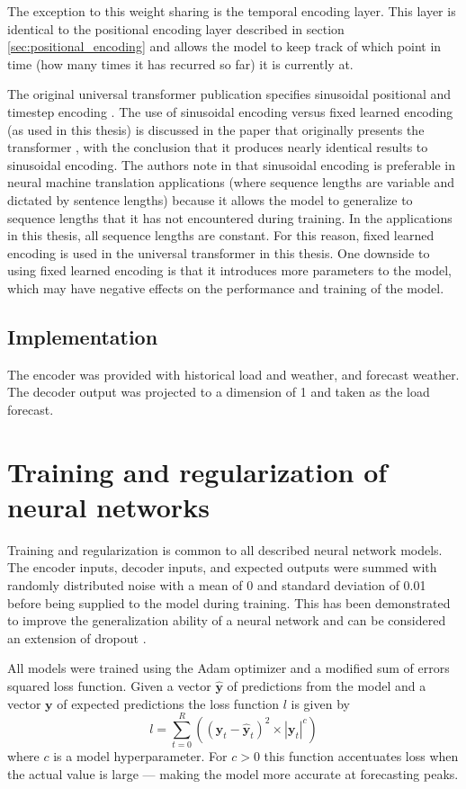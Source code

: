 The exception to this weight sharing is the temporal encoding layer.
This layer is identical to the positional encoding layer described in section \ref{sec:positional_encoding} and allows the model to keep track of which point in time (how many times it has recurred so far) it is currently at.

The original universal transformer publication specifies sinusoidal positional and timestep encoding \cite{Dehghani2018}.
The use of sinusoidal encoding versus fixed learned encoding (as used in this thesis) is discussed in the paper that originally presents the transformer \cite{Vaswani2017}, with the conclusion that it produces nearly identical results to sinusoidal encoding.
The authors note in \cite{Vaswani2017} that sinusoidal encoding is preferable in neural machine translation applications (where sequence lengths are variable and dictated by sentence lengths) because it allows the model to generalize to sequence lengths that it has not encountered during training.
In the applications in this thesis, all sequence lengths are constant.
For this reason, fixed learned encoding is used in the universal transformer in this thesis.
One downside to using fixed learned encoding is that it introduces more parameters to the model, which may have negative effects on the performance and training of the model.


\subsection{Implementation}
The encoder was provided with historical load and weather, and forecast weather.
The decoder output was projected to a dimension of 1 and taken as the load forecast.


\section{Training and regularization of neural networks}
\label{train-reg}
Training and regularization is common to all described neural network models.
The encoder inputs, decoder inputs, and expected outputs were summed with randomly distributed noise with a mean of 0 and standard deviation of 0.01 before being supplied to the model during training.
This has been demonstrated to improve the generalization ability of a neural network \cite{Wang1999} \cite{Brown2003} and can be considered an extension of dropout \cite{srivastava14a}.

All models were trained using the Adam optimizer \cite{Kingma2014} and a modified sum of errors squared loss function.
Given a vector $\boldsymbol{\hat{y}}$ of predictions from the model and a vector $\boldsymbol{y}$ of expected predictions the loss function $l$ is given by 
\begin{equation}
l = \sum_{t=0}^{R}((\boldsymbol{y}_t - \boldsymbol{\hat{y}}_t)^2 \times |\boldsymbol{y}_t|^c)
\end{equation}
where $c$ is a model hyperparameter.
For $c>0$ this function accentuates loss when the actual value is large --- making the model more accurate at forecasting peaks.


